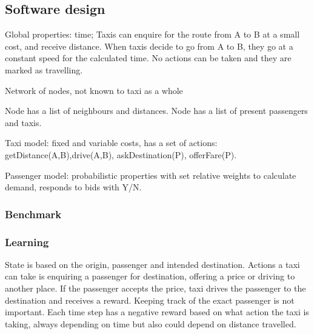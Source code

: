 \subsection{Software design}
\label{sec:design:software}

Global properties: time; Taxis
can enquire for the route from A to B at a small cost, and receive distance.
When taxis decide to go from A to B, they go at a constant speed for the
calculated time. No actions can be taken and they are marked as travelling.

Network of nodes, not known to taxi as a whole

Node has a list of neighbours and distances.
Node has a list of present passengers and taxis.

Taxi model: fixed and variable costs, has a set of actions:
getDistance(A,B),drive(A,B), askDestination(P), offerFare(P).

Passenger model: probabilistic properties with set relative weights to
calculate demand, responds to bids with Y/N.

\subsubsection{Benchmark}

\subsubsection{Learning}

State is based on the origin, passenger and intended destination. Actions a
taxi can take is enquiring a passenger for destination, offering a price or
driving to another place. If the passenger accepts the price, taxi drives the
passenger to the destination and receives a reward. Keeping track of the exact
passenger is not important. Each time step has a negative reward based on what
action the taxi is taking, always depending on time but also could depend on
distance travelled.
